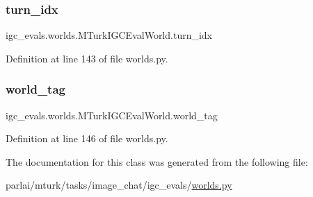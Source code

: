\subsubsection{\texorpdfstring{turn\+\_\+idx}{turn\_idx}}
{\footnotesize\ttfamily igc\+\_\+evals.\+worlds.\+M\+Turk\+I\+G\+C\+Eval\+World.\+turn\+\_\+idx}



Definition at line 143 of file worlds.\+py.

\mbox{\label{classigc__evals_1_1worlds_1_1MTurkIGCEvalWorld_a71ee5ba95de2b115ad926db20bf88ae4}} 
\subsubsection{\texorpdfstring{world\+\_\+tag}{world\_tag}}
{\footnotesize\ttfamily igc\+\_\+evals.\+worlds.\+M\+Turk\+I\+G\+C\+Eval\+World.\+world\+\_\+tag}



Definition at line 146 of file worlds.\+py.



The documentation for this class was generated from the following file\+:\begin{DoxyCompactItemize}
\item 
parlai/mturk/tasks/image\+\_\+chat/igc\+\_\+evals/\hyperlink{parlai_2mturk_2tasks_2image__chat_2igc__evals_2worlds_8py}{worlds.\+py}\end{DoxyCompactItemize}
